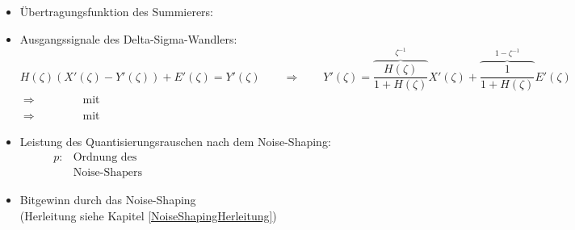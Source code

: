 		\begin{itemize}
		 \item Übertragungsfunktion des Summierers:$\qquad$\\[-0.2cm]
		 \item Ausgangssignale des Delta-Sigma-Wandlers:\\[-0.55cm]
		 \hspace*{0.5cm}$H(\zeta)(X'(\zeta)-Y'(\zeta))+E'(\zeta) = Y'(\zeta)\qquad\Rightarrow\qquad Y'(\zeta) =\overbrace{\dfrac{H(\zeta)}{1+H(\zeta)}}^{\zeta^{-1}}X'(\zeta)+ \overbrace{\dfrac{1}{1+H(\zeta)}}^{1-\zeta^{-1}}E'(\zeta) $\\[0.25cm]
		 \hspace*{0.5cm}$\Rightarrow\qquad$$\qquad$mit$\qquad$\\[0.25cm]
		 \hspace*{0.5cm}$\Rightarrow\qquad$$\qquad$mit$\qquad$\\[-0.3cm]
		 \item Leistung des Quantisierungsrauschen nach dem Noise-Shaping:\\[0.2cm]
		 $\qquad$$\;\;\begin{array}{ll}p:&\text{Ordnung des}\\&\text{Noise-Shapers}\end{array}$\\[0cm]
		 \item Bitgewinn durch das Noise-Shaping\\ (Herleitung siehe Kapitel \ref{NoiseShapingHerleitung})\\[-1.1cm]
		 \hspace*{7cm}
		\end{itemize}
\newpage
